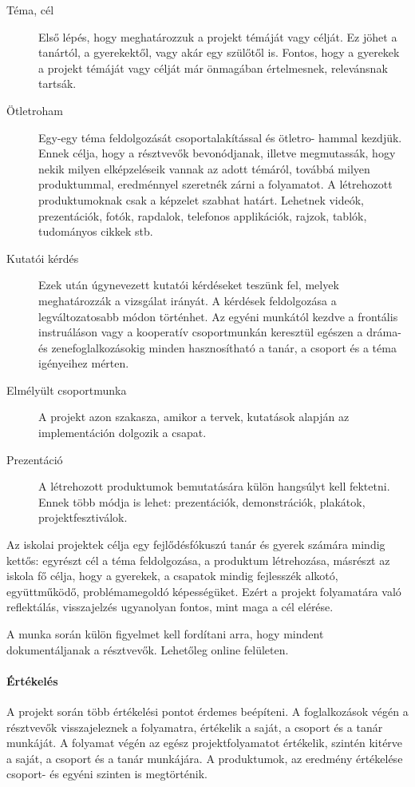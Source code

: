 \begin{description}
      \item[Téma, cél] Első lépés, hogy meghatározzuk a projekt témáját vagy
            célját. Ez jöhet a tanártól, a gyerekektől, vagy akár egy szülőtől is. Fontos, hogy a gyerekek a projekt témáját vagy célját már önmagában értelmesnek, relevánsnak tartsák.

      \item [Ötletroham]  Egy-egy téma feldolgozását csoportalakítással és
        ötletro-\linebreak
        hammal kezdjük. Ennek célja, hogy a résztvevők bevonódjanak, illetve megmutassák, hogy nekik milyen elképzeléseik vannak az adott témáról, továbbá milyen produktummal, eredménnyel szeretnék zárni a folyamatot. A létrehozott produktumoknak csak a képzelet szabhat határt. Lehetnek videók, prezentációk, fotók, rapdalok, telefonos applikációk, rajzok, tablók, tudományos cikkek stb. 

      \item [Kutatói kérdés] Ezek után úgynevezett kutatói kérdéseket teszünk
            fel, melyek meghatározzák a vizsgálat irányát. A kérdések feldolgozása a legváltozatosabb módon történhet. Az egyéni munkától kezdve a frontális instruáláson vagy a kooperatív csoportmunkán keresztül egészen a dráma- és zenefoglalkozásokig minden hasznosítható a tanár, a csoport és a téma igényeihez mérten.
      \item [Elmélyült csoportmunka] A projekt azon szakasza, amikor a tervek,
            kutatások alapján az implementáción dolgozik a csapat.
      \item [Prezentáció] A létrehozott produktumok bemutatására külön
            hangsúlyt kell fektetni. Ennek több módja is lehet: prezentációk, demonstrációk, plakátok, projektfesztiválok.
\end{description}

Az iskolai projektek célja egy fejlődésfókuszú tanár és gyerek számára mindig kettős: egyrészt cél a téma feldolgozása, a produktum létrehozása, másrészt az iskola fő célja, hogy a gyerekek, a csapatok mindig fejlesszék alkotó, együttműködő, problémamegoldó képességüket. Ezért a projekt folyamatára való reflektálás, visszajelzés ugyanolyan fontos, mint maga a cél elérése.

A munka során külön figyelmet kell fordítani arra, hogy mindent dokumentáljanak a résztvevők. Lehetőleg online felületen.

\paragraph{Értékelés} A projekt során több értékelési pontot érdemes beépíteni.
A foglalkozások végén a résztvevők visszajeleznek a folyamatra, értékelik a saját, a csoport és a tanár munkáját. A folyamat végén az egész projektfolyamatot értékelik, szintén kitérve a saját, a csoport és a tanár munkájára. A produktumok, az eredmény értékelése csoport- és egyéni szinten is megtörténik.

